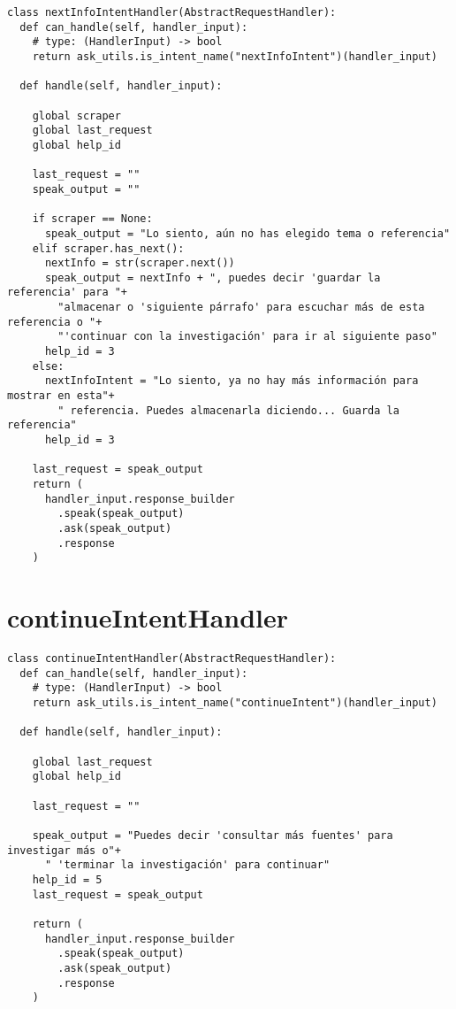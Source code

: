 \begin{tcolorbox}[colback=white!25!white,colframe=blue]
  \begin{verbatim}
class nextInfoIntentHandler(AbstractRequestHandler):
  def can_handle(self, handler_input):
    # type: (HandlerInput) -> bool
    return ask_utils.is_intent_name("nextInfoIntent")(handler_input)

  def handle(self, handler_input):
        
    global scraper
    global last_request
    global help_id
        
    last_request = ""
    speak_output = ""
        
    if scraper == None:
      speak_output = "Lo siento, aún no has elegido tema o referencia"
    elif scraper.has_next():
      nextInfo = str(scraper.next())
      speak_output = nextInfo + ", puedes decir 'guardar la referencia' para "+
        "almacenar o 'siguiente párrafo' para escuchar más de esta referencia o "+
        "'continuar con la investigación' para ir al siguiente paso"
      help_id = 3
    else:
      nextInfoIntent = "Lo siento, ya no hay más información para mostrar en esta"+
        " referencia. Puedes almacenarla diciendo... Guarda la referencia"
      help_id = 3
    
    last_request = speak_output
    return (
      handler_input.response_builder
        .speak(speak_output)
        .ask(speak_output)
        .response
    )
  \end{verbatim}
\end{tcolorbox}


\section{continueIntentHandler}
\label{A10Anexo}

\begin{tcolorbox}[colback=white!25!white,colframe=blue]
  \begin{verbatim}
class continueIntentHandler(AbstractRequestHandler):
  def can_handle(self, handler_input):
    # type: (HandlerInput) -> bool
    return ask_utils.is_intent_name("continueIntent")(handler_input)

  def handle(self, handler_input):
        
    global last_request
    global help_id
        
    last_request = ""
        
    speak_output = "Puedes decir 'consultar más fuentes' para investigar más o"+
      " 'terminar la investigación' para continuar"
    help_id = 5
    last_request = speak_output
        
    return (
      handler_input.response_builder
        .speak(speak_output)
        .ask(speak_output)
        .response
    )
  \end{verbatim}
\end{tcolorbox}

